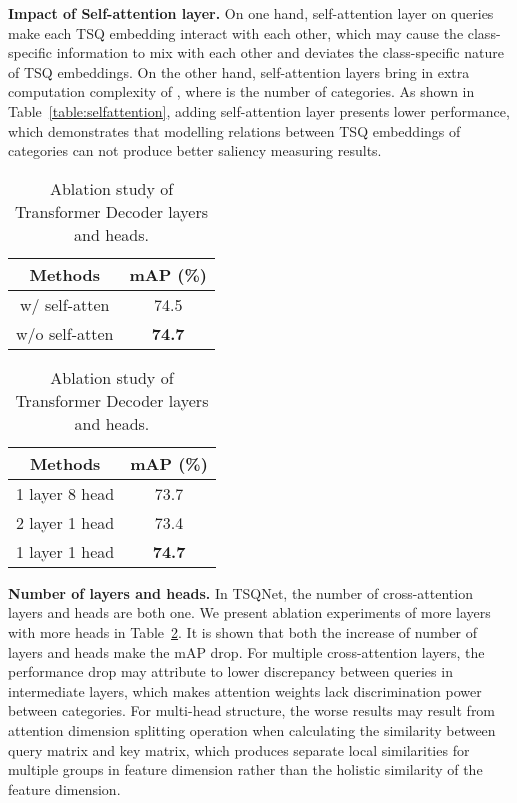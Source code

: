 \documentclass[runningheads]{llncs}
\newcommand{\tabref}[1]{Table~\ref{#1}}
\begin{document}
\noindent \textbf{Impact of Self-attention layer.}
On one hand, self-attention layer on queries make each TSQ embedding interact with each other, which may cause the class-specific information to mix with each other and deviates the class-specific nature of TSQ embeddings. On the other hand, self-attention layers bring in extra computation complexity of  ,  where  is the number of categories.
As shown in \tabref{table:selfattention}, adding self-attention layer presents lower performance, which demonstrates that modelling relations between TSQ embeddings of categories can not produce better saliency measuring results. 


\begin{table}
\centering
\begin{minipage}[t]{0.45\textwidth}
\centering
\caption{Ablation study of the usage of self-attention.}
\label{table:selfattention}
\renewcommand{\arraystretch}{1.3}
\begin{tabular}{cc}
\toprule
Methods & mAP (\%) \\
\midrule
w/ self-atten &  74.5  \\
w/o self-atten & \textbf{74.7} \\
\bottomrule
\end{tabular}
\end{minipage}
\hfill
\begin{minipage}[t]{0.45\textwidth}
\centering
\caption{Ablation study of Transformer Decoder layers and heads.}
\label{table:layerhead}
\begin{tabular}{cc}
\toprule
Methods & mAP (\%) \\
\midrule
1 layer 8 head & 73.7 \\
2 layer 1 head & 73.4 \\
1 layer 1 head &  \textbf{74.7}  \\
\bottomrule
\end{tabular}
\end{minipage}
\end{table}


\noindent \textbf{Number of layers and heads.}
In TSQNet, the number of cross-attention layers and heads are both one. We present ablation experiments of more layers with more heads in \tabref{table:layerhead}. It is shown that both the increase of number of layers and heads make the mAP drop. For multiple cross-attention layers, the performance drop may attribute to lower discrepancy between queries in intermediate layers, which makes attention weights lack discrimination power between categories.
For multi-head structure, the worse results may result from attention dimension splitting operation when calculating the similarity between query matrix and key matrix, which produces separate local similarities for multiple groups in feature dimension rather than the holistic similarity of the feature dimension.
\end{document}
